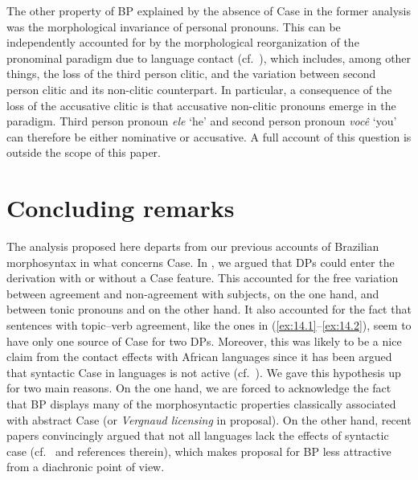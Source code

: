 \documentclass[output=paper]{langsci/langscibook}
\begin{document}
The other property of \gls{BP} explained by the absence of Case in the former
analysis was the morphological invariance of personal pronouns. This can be
independently accounted for by the morphological reorganization of the
pronominal paradigm due to language contact (cf.\ ), which
includes, among other things, the loss of the third person clitic, and the
variation between second person clitic and its non-clitic counterpart. In
particular, a consequence of the loss of the accusative clitic is that
accusative non-clitic pronouns emerge in the paradigm. Third person pronoun
\emph{ele} ‘he’ and second person pronoun \emph{você} ‘you’ can therefore be
either nominative or accusative.  A full account of this question is outside
the scope of this paper.

\section{Concluding remarks}\label{sec:14.7}

The analysis proposed here departs from our previous accounts of Brazilian
mor\-pho\-syn\-tax in what concerns Case. In
\textcite{AvelarGalves2011,AvelarGalves2016}, we argued that DPs could enter
the derivation with or without a Case feature. This accounted for the free
variation between agreement and non-agreement with subjects, on the one hand, and
between tonic pronouns and  on the other hand. It also accounted for the
fact that sentences with topic--verb agreement, like the ones in
(\ref{ex:14.1}--\ref{ex:14.2}), seem to have only one source of
Case for two DPs.  Moreover, this was likely to be a nice claim from the
contact effects with African languages since it has been argued that syntactic
Case in  languages is not active (cf.\ \citealt{Diercks2012}). We gave
this hypothesis up for two main reasons. On the one hand, we are forced to
acknowledge the fact that BP displays many of the morphosyntactic properties
classically associated with abstract Case (or
\emph{Vergnaud licensing} in  proposal).  On the
other hand, recent papers convincingly argued that not all 
languages lack the effects of syntactic case (cf.\ \citealt{vanderWal2015} and
references therein), which makes  proposal for
\gls{BP} less attractive from a diachronic point of
view.
\end{document}
